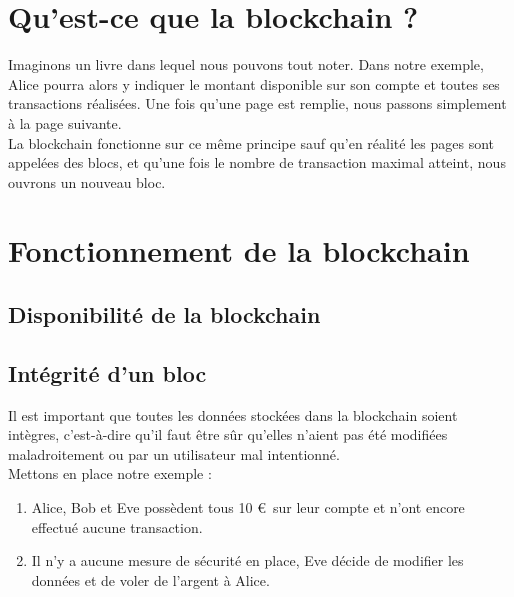 \documentclass[12pt, a4paper, oneside]{book}
\begin{document}
    \section{Qu'est-ce que la blockchain ?}
    Imaginons un livre dans lequel nous pouvons tout noter. Dans notre exemple, Alice pourra alors y indiquer le montant disponible sur son compte et toutes ses transactions réalisées. Une fois qu’une page est remplie, nous passons simplement à la page suivante.
    \\
    La blockchain fonctionne sur ce même principe sauf qu’en réalité les pages sont appelées des blocs, et qu’une fois le nombre de transaction maximal atteint, nous ouvrons un nouveau bloc.

    \section{Fonctionnement de la blockchain}
    
    \subsection{Disponibilité de la blockchain}
    
    \subsection{Intégrité d'un bloc}
    Il est important que toutes les données stockées dans la blockchain soient intègres, c’est-à-dire qu’il faut être sûr qu’elles n’aient pas été modifiées maladroitement ou par un utilisateur mal intentionné.
    \\
    Mettons en place notre exemple :
    \begin{enumerate}
        \item Alice, Bob et Eve possèdent tous 10 \euro~sur leur compte et n’ont encore effectué aucune transaction.
        \item Il n'y a aucune mesure de sécurité en place, Eve décide de modifier les données et de voler de l’argent à Alice.
    \end{enumerate}
\end{document}
